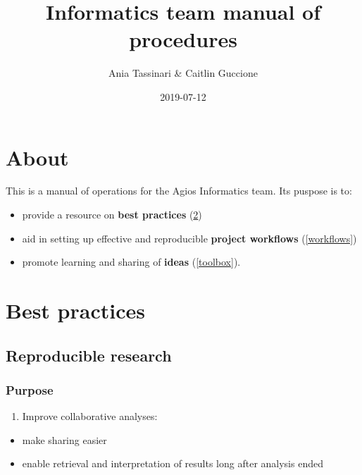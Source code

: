 \documentclass[openany]{article}
\title{Informatics team manual of procedures}
\author{Ania Tassinari \& Caitlin Guccione}
\date{2019-07-12}
\providecommand{\tightlist}{%
  \setlength{\itemsep}{0pt}\setlength{\parskip}{0pt}}
\begin{document}
\maketitle

{
\hypersetup{linkcolor=black}
\setcounter{tocdepth}{2}
\tableofcontents
}
\hypertarget{about}{%
\section{About}\label{about}}

This is a manual of operations for the Agios Informatics team. Its puspose is to:

\begin{itemize}
\tightlist
\item
  provide a resource on \textbf{best practices} (\ref{bestpractices})
\item
  aid in setting up effective and reproducible \textbf{project workflows} (\ref{workflows})
\item
  promote learning and sharing of \textbf{ideas} (\ref{toolbox}).
\end{itemize}

\hypertarget{bestpractices}{%
\section{Best practices}\label{bestpractices}}

\hypertarget{reproducible-research}{%
\subsection{Reproducible research}\label{reproducible-research}}

\hypertarget{purpose}{%
\subsubsection{Purpose}\label{purpose}}

\begin{enumerate}
\def\labelenumi{\arabic{enumi}.}
\tightlist
\item
  Improve collaborative analyses:
\end{enumerate}

\begin{itemize}
\tightlist
\item
  make sharing easier
\item
  enable retrieval and interpretation of results long after analysis ended
\end{itemize}
\end{document}
